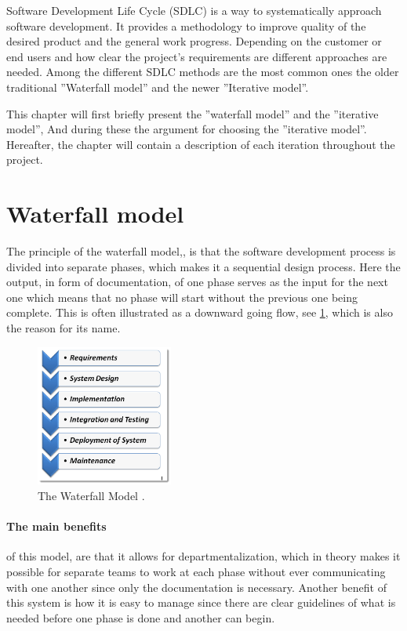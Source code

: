 Software Development Life Cycle (SDLC) is a way to systematically approach software development.
It provides a methodology to improve quality of the desired product and the general work progress.
Depending on the customer or end users and how clear the project's requirements are different approaches are needed.
Among the different SDLC methods are the most common ones the older traditional ''Waterfall model'' and the newer ''Iterative model''. \cite{SDLC-Toolsqa}

This chapter will first briefly present the ''waterfall model'' and the ''iterative model'', And during these the argument for choosing the ''iterative model''.
Hereafter, the chapter will contain a description of each iteration throughout the project.


\section{Waterfall model}\label{sec:WaterfallModel}
The principle of the waterfall model,\cite{Waterfall-Toolsqa}, is that the software development process is divided into separate phases, which makes it a sequential design process.
Here the output, in form of documentation, of one phase serves as the input for the next one which means that no phase will start without the previous one being complete.
This is often illustrated as a downward going flow, see \cref{fig:Waterfall}, which is also the reason for its name.

\begin{figure}[H]
	\centering
	\includegraphics[width=0.4\textwidth]{billeder/WaterFall-Model.png}
	\caption{The Waterfall Model \cite{Waterfall-Toolsqa}.}\label{fig:Waterfall}
\end{figure}

\paragraph{The main benefits} of this model, are that it allows for departmentalization, which in theory makes it possible for separate teams to work at each phase without ever communicating with one another since only the documentation is necessary.
Another benefit of this system is how it is easy to manage since there are clear guidelines of what is needed before one phase is done and another can begin.

